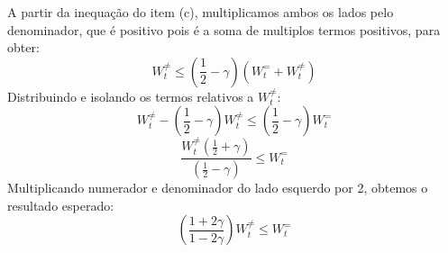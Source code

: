 A partir da inequação do item (c), multiplicamos ambos os lados pelo denominador, que é positivo pois
é a soma de multiplos termos positivos, para obter:
\begin{equation*}
    W_t^{\neq} \le \left(\frac{1}{2} - \gamma\right) (W_t^{=} + W_t^{\neq})
\end{equation*}
Distribuindo e isolando os termos relativos a $W_t^{\neq}$:
\begin{equation*}
    W_t^{\neq} - \left(\frac{1}{2} - \gamma\right) W_t^{\neq} \le \left(\frac{1}{2} - \gamma\right) W_t^{=}
\end{equation*}
\begin{equation*}
    \frac{W_t^{\neq} \left(\frac{1}{2} + \gamma\right)}{\left(\frac{1}{2} - \gamma\right)} \le W_t^{=}
\end{equation*}
Multiplicando numerador e denominador do lado esquerdo por 2, obtemos o resultado esperado:
\begin{equation*}
    \left(\frac{1 + 2\gamma}{1 - 2\gamma}\right) W_t^{\neq} \le W_t^{=}
\end{equation*}
